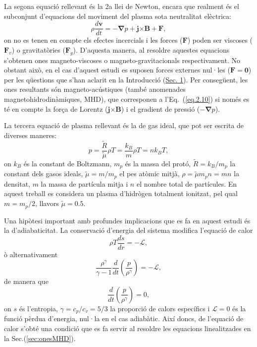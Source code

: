 La segona equació rellevant és la 2a llei de Newton, encara que realment és el subconjunt d'equacions del moviment del plasma sota neutralitat elèctrica:
\begin{equation}
	\rho \frac{d \bm{v}}{dt} = - \bm{\nabla} p + \bm{j} \bm{\times} \bm{B} + \bm{F}, \tag{2.10} \label{eq.2.10}
\end{equation}
on no es tenen en compte els efectes incercials i les forces ($\bm{F}$) poden ser viscoses ($\bm{F}_{v}$) o gravitatòries ($\bm{F}_g$).
D'aquesta manera, al resoldre aquestes equacions s'obtenen ones magneto-viscoses o magneto-gravitacionals respectivament.
No obstant això, en el cas d'aquest estudi es suposen forces externes nul·les ($\bm{F} = \bm{0}$) per les qüestions que s'han aclarit en la Introducció (\hyperref[sec:intro]{Sec. 1}). %
Per consegüent, les ones resultants són magneto-acústiques (també anomenades magnetohidrodinàmiques, MHD), que corresponen a l'Eq.~(\ref{eq.2.10}) si només es té en compte la força de Lorentz ($\bm{j} \bm{\times} \bm{B}$) i el gradient de pressió ($- \bm{\nabla} p$).

La tercera equació de plasma rellevant és la de gas ideal, que pot ser escrita de diverses maneres:
\begin{equation}
	p = \frac{\tilde{R}}{\tilde{\mu}} \rho T = \frac{k_B}{m} \rho T = n k_B T, \tag{2.11} \label{eq.2.11}
\end{equation}
on $k_B$ és la constant de Boltzmann, $m_p$ és la massa del protó, $\tilde{R} = k_B/m_p$ la constant dels gasos ideals, $\tilde{\mu} = m/m_p$ el pes atòmic
mitjà, $\rho = \tilde{\mu} m_p n = m n$ la densitat, $m$ la massa de partícula mitja i $n$ el nombre total de partícules.
En aquest treball es considera un plasma d'hidrògen totalment ionitzat, pel qual $m = m_p/2$, llavors $\tilde{\mu} = 0.5$.


Una hipòtesi important amb profundes implicacions que es fa en aquest estudi és la d'adiabaticitat. La conservació d'energia del sistema modifica l'equació de calor
\begin{equation}
	\rho T \frac{ds}{dr} = - \mathcal{L}, \tag{2.12} \label{eq.2.12}
\end{equation}
ò alternativament
\begin{equation}
	\frac{\rho^\gamma}{\gamma - 1} \frac{d}{dt} \left( \frac{p}{\rho^\gamma} \right) = - \mathcal{L}, \tag{2.13} \label{eq.2.13}
\end{equation}
de manera que
\begin{equation}
	\frac{d}{dt} \left( \frac{p}{\rho^\gamma} \right) = 0, \tag{2.14} \label{eq.2.14}
\end{equation}
on $s$ és l'entropia, $\gamma = c_p/c_v = 5/3$ la proporció de calors específics i $\mathcal{L}=0$ és la funció pèrdua d'energia, nul·la en el cas adiabàtic.
Així doncs, de l'equació de calor s'obté una condició que es fa servir al resoldre les equacions linealitzades en la Sec.(\ref{sec:onesMHD}).


